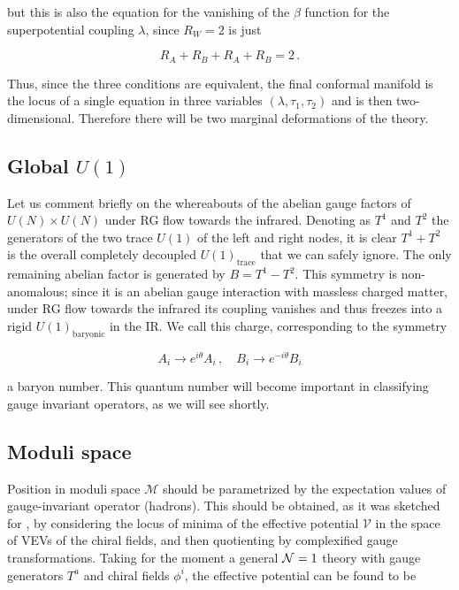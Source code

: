 but this is also the equation for the vanishing of the $\beta$ function for the superpotential coupling $\lambda$, since $R_W = 2$ is just

\begin{equation}
	R_A + R_B + R_A + R_B = 2\,.
	\label{}
\end{equation}

Thus, since the three conditions are equivalent, the final conformal manifold is the locus of a single equation in three variables $(\lambda,\tau_1,\tau_2)$ and is then two-dimensional. Therefore there will be two marginal deformations of the theory.

\subsection{Global $U(1)$} \label{sec:kwuone}

Let us comment briefly on the whereabouts of the abelian gauge factors of $U(N) \times U(N)$ under RG flow towards the infrared. Denoting as $T^1$ and $T^2$ the generators of the two trace $U(1)$ of the left and right nodes, it is clear $T^1+T^2$ is the overall completely decoupled $U(1)_\text{trace}$ that we can safely ignore. The only remaining abelian factor is generated by $B = T^1 - T^2$. This symmetry is non-anomalous; since it is an abelian gauge interaction with massless charged matter, under RG flow towards the infrared its coupling vanishes and thus freezes into a rigid $U(1)_\text{baryonic}$ in the IR. We call this charge, corresponding to the symmetry

\begin{equation}
	A_i \rightarrow e^{i\theta} A_i\,,\quad B_i \rightarrow e^{-i\theta} B_i
	\label{}
\end{equation}

a baryon number. This quantum number will become important in classifying gauge invariant operators, as we will see shortly.

\subsection{Moduli space}

Position in moduli space $\mathcal{M}$ should be parametrized by the expectation values of gauge-invariant operator (hadrons). This should be obtained, as it was sketched for \SYM, by considering the locus of minima of the effective potential $\mathcal{V}$ in the space of VEVs of the chiral fields, and then quotienting by complexified gauge transformations. Taking for the moment a general $\mathcal{N}=1$ theory with gauge generators $T^a$ and chiral fields $\phi^i$, the effective potential can be found to be

